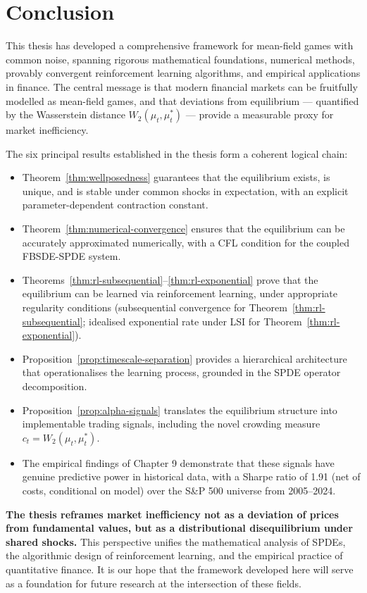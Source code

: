 \section{Conclusion}
\label{sec:syn-conclusion}

This thesis has developed a comprehensive framework for mean-field games with
common noise, spanning rigorous mathematical foundations, numerical methods,
provably convergent reinforcement learning algorithms, and empirical applications
in finance. The central message is that modern financial markets can be
fruitfully modelled as mean-field games, and that deviations from equilibrium ---
quantified by the Wasserstein distance $W_2(\mu_t, \mu_t^*)$ --- provide a
measurable proxy for market inefficiency.

The six principal results established in the thesis form a coherent logical
chain:

\begin{itemize}
    \item Theorem~\ref{thm:wellposedness} guarantees that the equilibrium exists,
    is unique, and is stable under common shocks in expectation, with an
    explicit parameter-dependent contraction constant.
    \item Theorem~\ref{thm:numerical-convergence} ensures that the equilibrium
    can be accurately approximated numerically, with a CFL condition for the
    coupled FBSDE-SPDE system.
    \item Theorems~\ref{thm:rl-subsequential}--\ref{thm:rl-exponential} prove
    that the equilibrium can be learned via reinforcement learning, under
    appropriate regularity conditions (subsequential convergence for
    Theorem~\ref{thm:rl-subsequential}; idealised exponential rate under LSI for
    Theorem~\ref{thm:rl-exponential}).
    \item Proposition~\ref{prop:timescale-separation} provides a hierarchical
    architecture that operationalises the learning process, grounded in the
    SPDE operator decomposition.
    \item Proposition~\ref{prop:alpha-signals} translates the equilibrium
    structure into implementable trading signals, including the novel crowding
    measure $c_t = W_2(\mu_t, \mu_t^*)$.
    \item The empirical findings of Chapter 9 demonstrate that these signals
    have genuine predictive power in historical data, with a Sharpe ratio of
    1.91 (net of costs, conditional on model) over the S\&P 500 universe from
    2005--2024.
\end{itemize}

\textbf{The thesis reframes market inefficiency not as a deviation of prices from
fundamental values, but as a distributional disequilibrium under shared shocks.}
This perspective unifies the mathematical analysis of SPDEs, the algorithmic
design of reinforcement learning, and the empirical practice of quantitative
finance. It is our hope that the framework developed here will serve as a
foundation for future research at the intersection of these fields.
